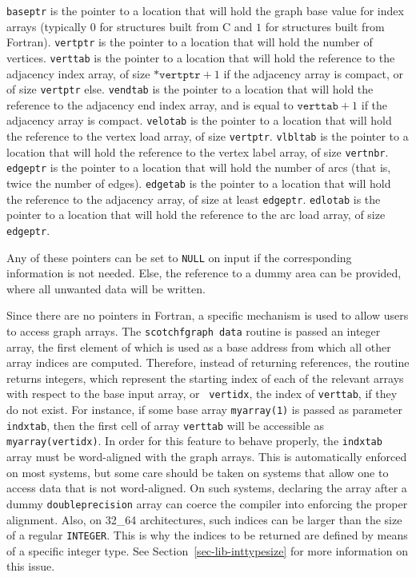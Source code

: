 \begin{itemize}
{\tt baseptr} is the pointer to a location that will hold the graph base
value for index arrays (typically $0$ for
structures built from C and $1$ for structures built from Fortran).
{\tt vertptr} is the pointer to a location that will hold the number of
vertices.
{\tt verttab} is the pointer to a location that will hold the reference to
the adjacency index array, of size $\mathtt{*vertptr} + 1$ if the
adjacency array is compact, or of size {\tt *vertptr} else.
{\tt vendtab} is the pointer to a location that will hold the reference to
the adjacency end index array, and is equal to $\mathtt{verttab} +
1$ if the adjacency array is compact.
{\tt velotab} is the pointer to a location that will hold the reference to
the vertex load array, of size {\tt *vertptr}.
{\tt vlbltab} is the pointer to a location that will hold the reference to
the vertex label array, of size {\tt vertnbr}.
{\tt edgeptr} is the pointer to a location that will hold the number of arcs
(that is, twice the number of edges).
{\tt edgetab} is the pointer to a location that will hold the reference to
the adjacency array, of size at least {\tt *edgeptr}.
{\tt edlotab} is the pointer to a location that will hold the reference to
the arc load array, of size {\tt *edgeptr}.

Any of these pointers can be set to {\tt NULL} on input if the
corresponding information is not needed. Else, the reference to a
dummy area can be provided, where all unwanted data will be written.

Since there are no pointers in Fortran, a specific mechanism is used
to allow users to access graph arrays. The {\tt scotchf\lbt graph\lbt
data} routine is passed an integer array, the first element of which is used
as a base address from which all other array indices are
computed. Therefore, instead of returning references, the routine
returns integers, which represent the starting index of each of the
relevant arrays with respect to the base input array, or {\tt
vertidx}, the index of {\tt verttab}, if they do not exist. For
instance, if some base array {\tt myarray\lbt (1)} is passed as
parameter {\tt indxtab}, then the first cell of array {\tt verttab}
will be accessible as {\tt myarray\lbt (vertidx)}.
In order for this feature to behave properly, the {\tt indxtab}
array must be word-aligned with the graph arrays. This is
automatically enforced on most systems, but some care should be
taken on systems that allow one to access data that is not
word-aligned. On such systems, declaring the array after a
dummy {\tt double\lbt precision} array can coerce the compiler
into enforcing the proper alignment. Also, on 32\_64 architectures,
such indices can be larger than the size of a regular
{\tt INTEGER}. This is why the indices to be returned are defined by
means of a specific integer type. See
Section~\ref{sec-lib-inttypesize} for more information on this
issue.
\end{itemize}




